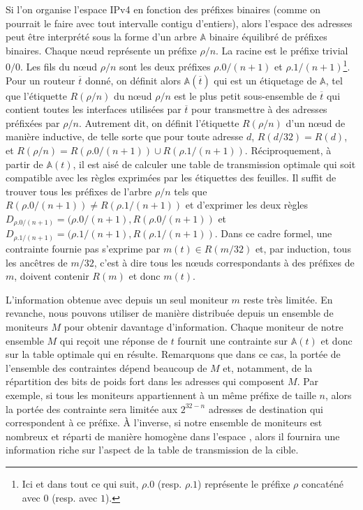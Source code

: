Si l'on organise l'espace {\sc IPv4} en fonction des préfixes binaires (comme on
pourrait le faire avec tout intervalle contigu d'entiers), alors l'espace des
adresses peut être interprété sous la forme d'un arbre ${\mathbb A}$ binaire
équilibré de préfixes binaires. Chaque n\oe{}ud représente un préfixe $\rho/n$. La
racine est le préfixe trivial $0/0$. Les fils du n\oe{}ud $\rho/n$ sont les deux
préfixes $\rho.0/(n+1)$ et $\rho.1/(n+1)$\footnote{Ici et dans tout ce qui
suit, $\rho.0$ (resp. $\rho.1$) représente le préfixe $\rho$ concaténé avec $0$
(resp. avec $1$).}.
Pour un routeur $\overline{t}$ donné, on définit alors ${\mathbb A}(\overline{t})$ qui est un étiquetage de ${\mathbb
A}$, tel que l'étiquette $R(\rho/n)$ du n\oe{}ud $\rho/n$ est le plus petit
sous-ensemble de $\overline{t}$ qui contient toutes les interfaces utilisées par
$\overline{t}$ pour transmettre à des adresses préfixées par $\rho/n$. Autrement
dit, on définit l'étiquette $R(\rho/n)$ d'un n\oe{}ud de manière inductive, de
telle sorte que pour toute adresse $d$, $R(d/32) = R(d)$, et $R(\rho/n) =
R(\rho.0/(n+1)) \cup R(\rho.1/(n+1))$. Réciproquement, à partir de ${\mathbb
A}(t)$, il est aisé de calculer une table de transmission optimale qui soit
compatible avec les règles exprimées par les étiquettes des feuilles.
Il suffit de trouver tous les préfixes de l'arbre $\rho/n$ tels que
$R(\rho.0/(n+1)) \neq R(\rho.1/(n+1))$ et d'exprimer les deux règles
$D_{\rho.0/(n+1)} = (\rho.0/(n+1), R(\rho.0/(n+1))$ et $ D_{\rho.1/(n+1)} =
(\rho.1/(n+1), R(\rho.1/(n+1))$.
Dans ce cadre formel, une contrainte fournie pas \udpping s'exprime par $m(t) \in
R(m/32)$ et, par induction, tous les ancêtres de $m/32$, c'est à dire tous les
n\oe{}uds correspondants à des préfixes de $m$, doivent contenir $R(m)$ et donc
$m(t)$.

L'information obtenue avec \udpping depuis un seul moniteur $m$ reste très
limitée. En revanche, nous pouvons utiliser \udpping de manière distribuée
depuis un ensemble de moniteurs $M$ pour obtenir davantage d'information. Chaque
moniteur de notre ensemble $M$ qui reçoit une réponse de $t$ fournit une
contrainte sur ${\mathbb A}(t)$ et donc sur la table optimale qui en résulte.
Remarquons que dans ce cas, la portée de l'ensemble des contraintes dépend
beaucoup de $M$ et, notamment, de la répartition des bits de poids fort dans les
adresses qui composent $M$. Par exemple, si tous les moniteurs appartiennent à
un même préfixe de taille $n$, alors la portée des contrainte sera limitée aux
$2^{32-n}$ adresses de destination qui correspondent à ce préfixe. À l'inverse,
si notre ensemble de moniteurs est nombreux et réparti de manière homogène dans
l'espace \ip, alors il fournira une information riche sur l'aspect de la table
de transmission de la cible.
 

